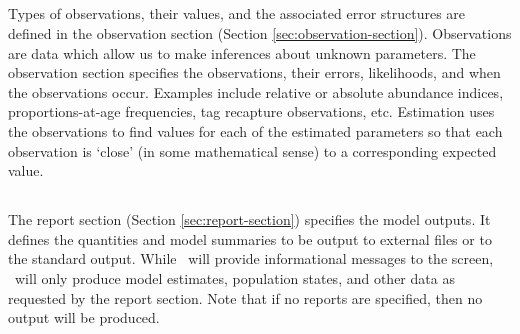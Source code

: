 \subsection{}
Types of observations, their values, and the associated error structures are defined in the observation section (Section \ref{sec:observation-section}). Observations are data which allow us to make inferences about unknown parameters. The observation section specifies the observations, their errors, likelihoods, and when the observations occur. Examples include relative or absolute abundance indices, proportions-at-age frequencies, tag recapture observations, etc. Estimation uses the observations to find values for each of the estimated parameters so that each observation is `close' (in some mathematical sense) to a corresponding expected value. 

\subsection{}
The report section (Section \ref{sec:report-section}) specifies the model outputs. It defines the quantities and model summaries to be output to external files or to the standard output. While \CNAME\ will provide informational messages to the screen, \CNAME\ will only produce model estimates, population states, and other data as requested by the report section. Note that if no reports are specified, then no output will be produced.

